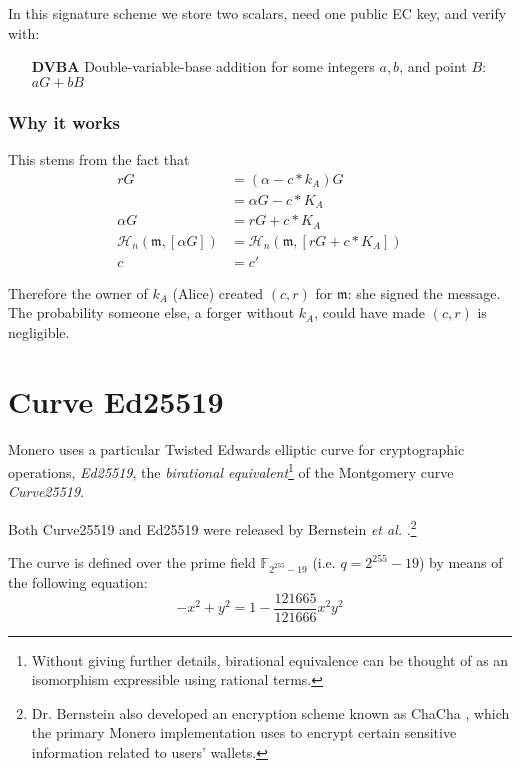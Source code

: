 In this signature scheme we store two scalars, need one public EC key, and verify with:

\begin{itemize}
    \setlength\itemsep{\listspace}
    \item [\textbf{DVBA}] Double-variable-base addition for some integers $a, b$, and point $B$: $a G + b B$ \quad [1]
\end{itemize}


\subsubsection*{Why it works}

This stems from the fact that
\begin{align*}
  	 r G &= (\alpha - c*k_A) G \\
  	  	 &= \alpha G - c*K_A \\
\alpha G &= r G + c*K_A \\
\mathcal{H}_n(\mathfrak{m},[\alpha G]) &= \mathcal{H}_n(\mathfrak{m},[r G + c*K_A]) \\
       c &= c'
\end{align*}

Therefore the owner of $k_A$ (Alice) created $(c,r)$ for $\mathfrak{m}$: she signed the message. The probability someone else, a forger without $k_A$, could have made $(c,r)$ is negligible.


\section{Curve Ed25519}
\label{Ed25519_section}

Monero uses a particular Twisted Edwards elliptic curve for cryptographic operations, {\em Ed25519}, the {\em birational equivalent}\footnote{\label{birational_note}Without giving further details, birational equivalence can be thought of as an isomorphism expressible using rational terms.} 
of the Montgomery curve {\em Curve25519}.

Both Curve25519 and Ed25519 were released by Bernstein {\em et al.} \cite{Bernstein2008, Bernstein2012, Bernstein2007}.\footnote{Dr. Bernstein also developed an encryption scheme known as ChaCha \cite{Bernstein_chacha,chacha-irtf}, which the primary Monero implementation uses to encrypt certain sensitive information related to users' wallets.}

The curve is defined over the prime field \(\mathbb{F}_{2^{255} - 19} \) (i.e. $q = 2^{255}-19$) by means of the following equation:\\
\[ -x^2 + y^2 = 1 - \frac{121665}{121666} x^2 y^2 \]

